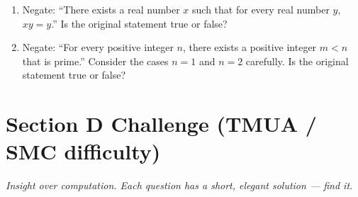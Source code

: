 \documentclass[11pt,a4paper]{article}
\begin{document}
\begin{enumerate}
\item Negate: ``There exists a real number $x$ such that for every real number $y$, $xy=y$.'' Is the original statement true or false?

\item Negate: ``For every positive integer $n$, there exists a positive integer $m<n$ that is prime.'' Consider the cases $n=1$ and $n=2$ carefully. Is the original statement true or false?

\end{enumerate}

\section*{Section D \quad Challenge \hfill{\normalfont\small(TMUA / SMC difficulty)}}

\noindent\textit{Insight over computation. Each question has a short, elegant solution --- find it.}
\end{document}
